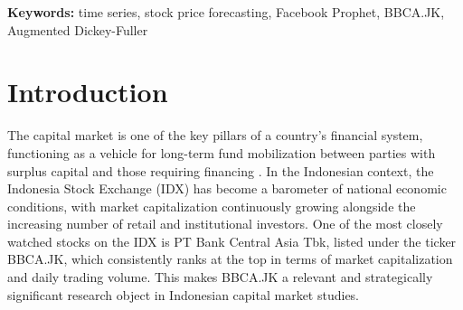 \documentclass[11pt,twoside]{article}
\author{
\begin{minipage}{\textwidth}
\authorone,
\authortwo,
\authorthree,
\authorfour
\\[1em]
$^1$ \affilone\\
\corrauthor
\end{minipage}
}
\newcommand{\SMDSKeywords}[1]{
\vspace{0.5em}
\noindent\textbf{Keywords:} #1
}
\begin{document}
\maketitle

\begin{abstract}

Theiiiii stock market is one of the most dynamic investment instruments, heavily influenced by economic,
political, and market psychology factors. PT Bank Central Asia Tbk (BBCA.JK) is among the most
liquid and largest market-capitalization banking stocks on the Indonesia Stock Exchange, making
accurate price forecasting critically important for investors and financial decision-makers. This study
aims to forecast the daily closing price of BBCA.JK using the Facebook Prophet method, a
time-series decomposition model based on trend, seasonal, and holiday components developed by
Meta's Core Data Science team. The dataset consists of 1,787 daily closing price observations
spanning from January 1, 2019 to May 8, 2026, sourced from Yahoo Finance. The analysis covers
data exploration and visualization, identification of trend and seasonal components, stationarity
testing via the Augmented Dickey-Fuller (ADF) test, Prophet model fitting, model evaluation, and
five-period-ahead forecasting. Results indicate that the Prophet model effectively captures trend and
seasonal patterns in stock price data with satisfactory predictive performance. Short- and
medium-term forecasts suggest discernible price movement tendencies that may serve as preliminary
references for investors. This study contributes to the application of modern decomposition-based
time-series methods in the context of the Indonesian capital market.

\end{abstract}

\SMDSKeywords{time series, stock price forecasting, Facebook Prophet, BBCA.JK, Augmented Dickey-Fuller}

\section{Introduction}
\label{Sec:Intro}

The capital market is one of the key pillars of a country's financial system, functioning as a vehicle for long-term fund mobilization between parties with surplus capital and those requiring financing \cite{Tandelilin2010}. In the Indonesian context, the Indonesia Stock Exchange (IDX) has become a barometer of national economic conditions, with market capitalization continuously growing alongside the increasing number of retail and institutional investors. One of the most closely watched stocks on the IDX is PT Bank Central Asia Tbk, listed under the ticker BBCA.JK, which consistently ranks at the top in terms of market capitalization and daily trading volume. This makes BBCA.JK a relevant and strategically significant research object in Indonesian capital market studies.
\end{document}
